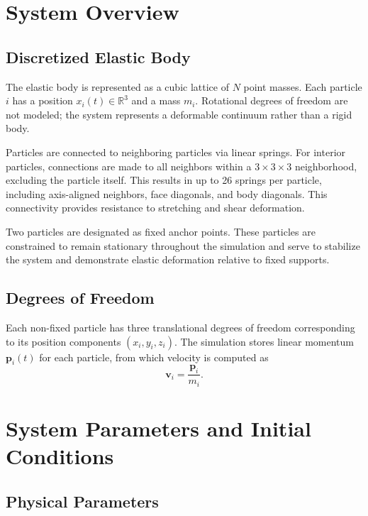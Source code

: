 \documentclass[manuscript,nonacm,12pt,letterpaper]{acmart}
\begin{document}
\section{System Overview}
\label{Sec2:SysOverview}

\subsection{Discretized Elastic Body}
\label{Sec2.1:Body}

The elastic body is represented as a cubic lattice of $N$ point masses. Each particle $i$ has a position ${x}_i(t) \in \mathbb{R}^3$ and a mass $m_i$. Rotational degrees of freedom are not modeled; the system represents a deformable continuum rather than a rigid body.

Particles are connected to neighboring particles via linear springs. For interior particles, connections are made to all neighbors within a $3 \times 3 \times 3$ neighborhood, excluding the particle itself. This results in up to 26 springs per particle, including axis-aligned neighbors, face diagonals, and body diagonals. This connectivity provides resistance to stretching and shear deformation.

Two particles are designated as fixed anchor points. These particles are constrained to remain stationary throughout the simulation and serve to stabilize the system and demonstrate elastic deformation relative to fixed supports.

\subsection{Degrees of Freedom}
\label{Sec2.1:DegreesOfFreedom}

Each non-fixed particle has three translational degrees of freedom corresponding to its position components $(x_i, y_i, z_i)$. The simulation stores linear momentum $\mathbf{p}_i(t)$
for each particle, from which velocity is computed as
\[
\mathbf{v}_i = \frac{\mathbf{p}_i}{m_i}.
\]

\section{System Parameters and Initial Conditions}
\label{Sec3:SysParams}

\subsection{Physical Parameters}
\label{Sec3.1:PhysicalParams}
\end{document}
